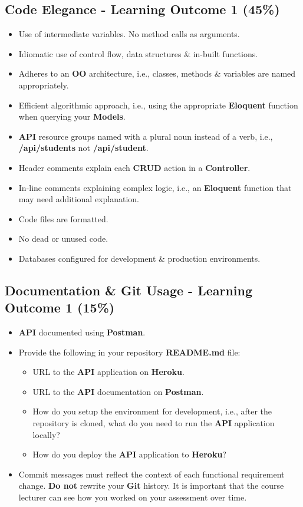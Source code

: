 \documentclass{article}
\begin{document}
\subsection*{Code Elegance - Learning Outcome 1 (45\%)}
\begin{itemize}
	\item Use of intermediate variables. No method calls as arguments.
	\item Idiomatic use of control flow, data structures \& in-built functions.
	\item Adheres to an \textbf{OO} architecture, i.e., classes, methods \& variables are named appropriately.
	\item Efficient algorithmic approach, i.e., using the appropriate \textbf{Eloquent} function when querying your \textbf{Models}.
	\item \textbf{API} resource groups named with a plural noun instead of a verb, i.e., \textbf{/api/students} not \textbf{/api/student}.
	\item Header comments explain each \textbf{CRUD} action in a \textbf{Controller}.
	\item In-line comments explaining complex logic, i.e., an \textbf{Eloquent} function that may need additional explanation.
	\item Code files are formatted.
	\item No dead or unused code.
	\item Databases configured for development \& production environments.
\end{itemize}

\subsection*{Documentation \& Git Usage - Learning Outcome 1 (15\%)}
\begin{itemize}
  \item \textbf{API} documented using \textbf{Postman}.
	\item Provide the following in your repository \textbf{README.md} file:
	      \begin{itemize}
		      \item URL to the \textbf{API} application on \textbf{Heroku}.
		      \item URL to the \textbf{API} documentation on \textbf{Postman}.
		      \item How do you setup the environment for development, i.e., after the repository is cloned, what do you need to run the \textbf{API} application locally?
					\item How do you deploy the \textbf{API} application to \textbf{Heroku}?
	      \end{itemize}
			\end{itemize}
			\begin{itemize}
	\item Commit messages must reflect the context of each functional requirement change. \textbf{Do not} rewrite your \textbf{Git} history. It is important that the course lecturer can see how you worked on your assessment over time.
\end{itemize}
\end{document}
